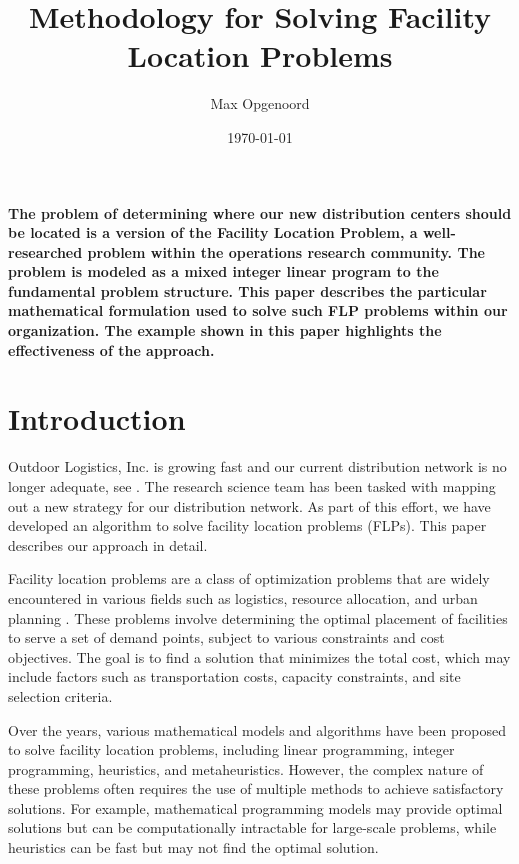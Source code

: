 \documentclass[hidelinks,twoside,10pt,letterpaper]{../note}
\begin{document}
\title{Methodology for Solving {Facility Location Problems}}

\author{Max Opgenoord}
\date{\today}

\makeatletter
\let\newtitle\@title
\makeatother

\maketitle

\pagestyle{mainmatter}
\thispagestyle{empty}

{\bfseries\noindent
The problem of determining where our new distribution centers should be located is a version of the Facility Location Problem, a well-researched problem within the operations research community.
The problem is modeled as a mixed integer linear program
to the fundamental problem structure.
This paper describes the particular mathematical formulation used to solve such FLP problems within our organization.
The example shown in this paper highlights the effectiveness of the approach.
}

\section{Introduction}
Outdoor Logistics, Inc. is growing fast and our current distribution network is no longer adequate, see .
The research science team has been tasked with mapping out a new strategy for our distribution network.
As part of this effort, we have developed an algorithm to solve facility location problems (FLPs).
This paper describes our approach in detail.

Facility location problems are a class of optimization problems that are widely encountered in various fields such as logistics, resource allocation, and urban planning \cite{farahani2009facility}.
These problems involve determining the optimal placement of facilities to serve a set of demand points, subject to various constraints and cost objectives.
The goal is to find a solution that minimizes the total cost, which may include factors such as transportation costs, capacity constraints, and site selection criteria.

Over the years, various mathematical models and algorithms have been proposed to solve facility location problems, including linear programming, integer programming, heuristics, and metaheuristics.
However, the complex nature of these problems often requires the use of multiple methods to achieve satisfactory solutions.
For example, mathematical programming models may provide optimal solutions but can be computationally intractable for large-scale problems, while heuristics can be fast but may not find the optimal solution.
\end{document}
